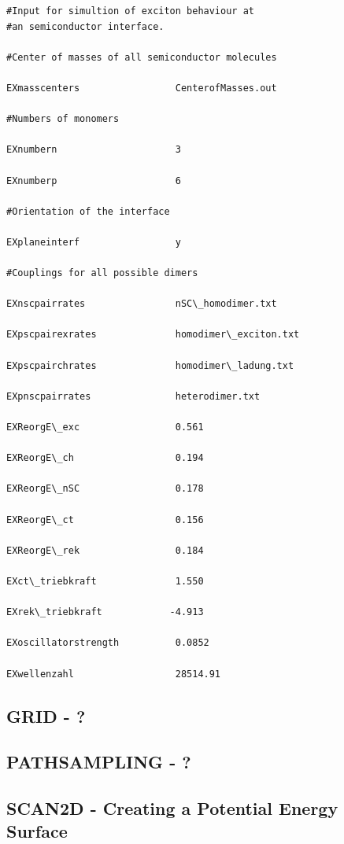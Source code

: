\documentclass[10pt,a4paper]{article} %
\begin{document}
\begin{lstlisting}
#Input for simultion of exciton behaviour at 
#an semiconductor interface.

#Center of masses of all semiconductor molecules

EXmasscenters                 CenterofMasses.out

#Numbers of monomers

EXnumbern                     3

EXnumberp                     6

#Orientation of the interface

EXplaneinterf                 y

#Couplings for all possible dimers

EXnscpairrates                nSC\_homodimer.txt

EXpscpairexrates              homodimer\_exciton.txt

EXpscpairchrates              homodimer\_ladung.txt

EXpnscpairrates               heterodimer.txt

EXReorgE\_exc                 0.561

EXReorgE\_ch                  0.194

EXReorgE\_nSC                 0.178

EXReorgE\_ct                  0.156

EXReorgE\_rek                 0.184

EXct\_triebkraft              1.550

EXrek\_triebkraft            -4.913

EXoscillatorstrength          0.0852

EXwellenzahl                  28514.91
\end{lstlisting}	
	
	\subsection{GRID - ?}	
	
	\subsection{PATHSAMPLING - ?}	
	
	\subsection{SCAN2D - Creating a Potential Energy Surface}	
	
\end{document}
